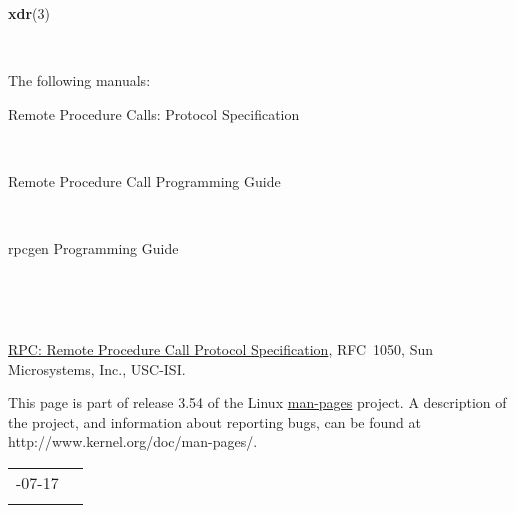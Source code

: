 \documentclass[]{article}
\let\realtextbf=\textbf
\renewcommand{\textbf}[1]{\textcolor{boldcolor}{\realtextbf{#1}}}
\renewcommand{\emph}[1]{\underline{#1}}
\begin{document}

\textbf{xdr}(3)

~

The following manuals:

Remote Procedure Calls: Protocol Specification

~

Remote Procedure Call Programming Guide

~

rpcgen Programming Guide

~

~

\emph{RPC: Remote Procedure Call Protocol Specification}, RFC~1050, Sun
Microsystems, Inc., USC-ISI.


This page is part of release 3.54 of the Linux \emph{man-pages} project.
A description of the project, and information about reporting bugs, can
be found at http://www.kernel.org/doc/man-pages/.

\begin{longtable}[c]{@{}ll@{}}
\toprule\addlinespace
2008-07-17 &
\\\addlinespace
\bottomrule
\end{longtable}
\end{document}
